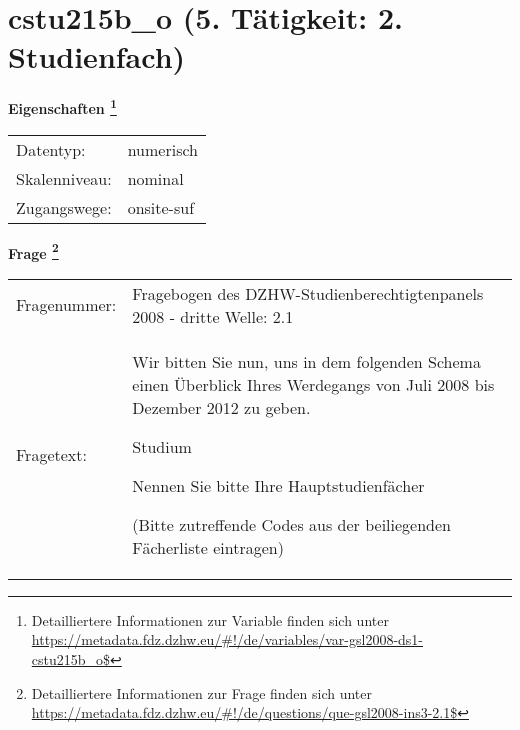 
    \setcounter{footnote}{0}

    \vspace*{-1.8cm}
	\section{cstu215b\_o (5. Tätigkeit: 2. Studienfach)}
	\label{section:cstu215b_o}



    \vspace*{0.5cm}
    \noindent\textbf{Eigenschaften
	\footnote{Detailliertere Informationen zur Variable finden sich unter
		\url{https://metadata.fdz.dzhw.eu/\#!/de/variables/var-gsl2008-ds1-cstu215b_o$}}}\\
	\begin{tabularx}{\hsize}{@{}lX}
	Datentyp: & numerisch \\
	Skalenniveau: & nominal \\
	Zugangswege: &
	  onsite-suf
 \\
    \end{tabularx}



				\vspace*{0.5cm}
                \noindent\textbf{Frage
	                \footnote{Detailliertere Informationen zur Frage finden sich unter
		              \url{https://metadata.fdz.dzhw.eu/\#!/de/questions/que-gsl2008-ins3-2.1$}}}\\
				\begin{tabularx}{\hsize}{@{}lX}
					Fragenummer: &
					  Fragebogen des DZHW-Studienberechtigtenpanels 2008 - dritte Welle:
					  2.1
 \\
					Fragetext: & Wir bitten Sie nun, uns in dem folgenden Schema einen Überblick Ihres Werdegangs von Juli 2008 bis Dezember 2012 zu geben.\par  Studium\par  Nennen Sie bitte Ihre Hauptstudienfächer\par  (Bitte zutreffende Codes aus der beiliegenden Fächerliste eintragen) \\
				\end{tabularx}





